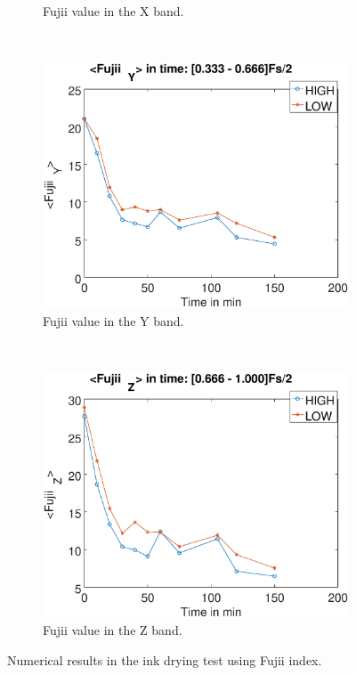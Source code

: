 \documentclass[review]{elsarticle}
\begin{document}
\begin{figure}[!h]
\begin{subfigure}[b]{0.475\textwidth}
	\caption{Fujii value in the X band.}
        \label{fig:fujiixink}
    \end{subfigure}
    ~\\ 
    \begin{subfigure}[b]{0.475\textwidth}
        \includegraphics[width=\textwidth]{fujii-bandy.eps}
	\caption{Fujii value in the Y band.}
        \label{fig:fujiiyink}
    \end{subfigure}
  ~
    \begin{subfigure}[b]{0.475\textwidth}
        \includegraphics[width=\textwidth]{fujii-bandz.eps}
	\caption{Fujii value in the Z band.}
        \label{fig:fujiizink}
    \end{subfigure}
    
\caption{Numerical results in the ink drying test using Fujii index.}
\label{fig:numericalvsfujii}
\end{figure}
\end{document}
